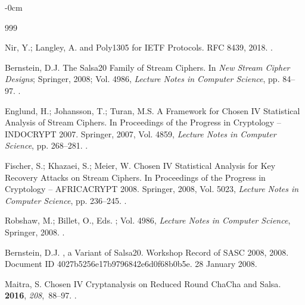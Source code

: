 \documentclass[electronics,article,submit,pdftex,oneauthor]{Definitions/mdpi}
\begin{document}
\begin{adjustwidth}{-\extralength}{0cm}
\raggedright
\begin{thebibliography}{999}

Nir, Y.; Langley, A.
 and {Poly1305} for {IETF} Protocols.
\newblock RFC 8439,  2018.
.

Bernstein, D.J.
\newblock The {Salsa20} Family of Stream Ciphers. In {\em New Stream Cipher
  Designs}; Springer,  2008; Vol. 4986, {\em Lecture Notes in Computer
  Science}, pp. 84--97.
.

Englund, H.; Johansson, T.; Turan, M.S.
\newblock A Framework for Chosen {IV} Statistical Analysis of Stream Ciphers.
\newblock In Proceedings of the Progress in Cryptology -- {INDOCRYPT} 2007.
  Springer,  2007, Vol. 4859, {\em Lecture Notes in Computer Science}, pp.
  268--281.
.

Fischer, S.; Khazaei, S.; Meier, W.
\newblock Chosen {IV} Statistical Analysis for Key Recovery Attacks on Stream
  Ciphers.
\newblock In Proceedings of the Progress in Cryptology -- {AFRICACRYPT} 2008.
  Springer,  2008, Vol. 5023, {\em Lecture Notes in Computer Science}, pp.
  236--245.
.

Robshaw, M.; Billet, O., Eds.
; Vol. 4986,
  {\em Lecture Notes in Computer Science}, Springer,  2008.
.

Bernstein, D.J.
, a Variant of {Salsa20}.
\newblock Workshop Record of {SASC} 2008,  2008.
\newblock Document ID 4027b5256e17b9796842e6d0f68b0b5e. 28 January 2008.

Maitra, S.
\newblock Chosen {IV} Cryptanalysis on Reduced Round {ChaCha} and {Salsa}.
 {\bf 2016}, {\em 208},~88--97.
.


\end{thebibliography}
\end{adjustwidth}
\end{document}
